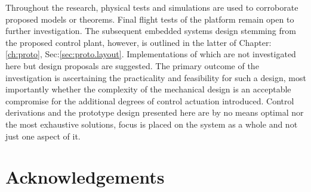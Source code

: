 \documentclass[a4paper, 11pt, oneside, openright, parskip=full]{book}
\begin{document}
\par
Throughout the research, physical tests and simulations are used to corroborate proposed models or theorems. Final flight tests of the platform remain open to further investigation. The subsequent embedded systems design stemming from the proposed control plant, however, is outlined in the latter of Chapter:\ref{ch:proto}, Sec:\ref{sec:proto.layout}. Implementations of which are not investigated here but design proposals are suggested. The primary outcome of the investigation is ascertaining the practicality and feasibility for such a design, most importantly whether the complexity of the mechanical design is an acceptable compromise for the additional degrees of control actuation introduced. Control derivations and the prototype design presented here are by no means optimal nor the most exhaustive solutions, focus is placed on the system as a whole and not just one aspect of it.
\par
\chapter{Acknowledgements}		
\label{ch:ack}



\end{document}
